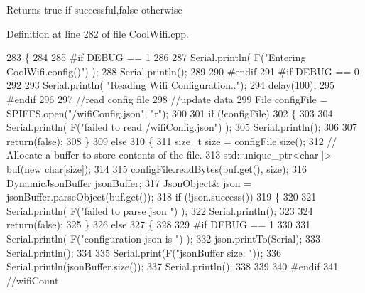 \begin{DoxyReturn}{Returns}
true if successful,false otherwise 
\end{DoxyReturn}


Definition at line 282 of file Cool\+Wifi.\+cpp.


\begin{DoxyCode}
283 \{
284 
285 \textcolor{preprocessor}{#if DEBUG == 1 }
286 
287     Serial.println( F(\textcolor{stringliteral}{"Entering CoolWifi.config()"}) );
288     Serial.println();
289 
290 \textcolor{preprocessor}{#endif}
291 \textcolor{preprocessor}{#if DEBUG == 0}
292 
293     Serial.println( \textcolor{stringliteral}{"Reading Wifi Configuration.."});
294     delay(100);
295 \textcolor{preprocessor}{#endif }
296 
297     \textcolor{comment}{//read config file}
298     \textcolor{comment}{//update data}
299     File configFile = SPIFFS.open(\textcolor{stringliteral}{"/wifiConfig.json"}, \textcolor{stringliteral}{"r"});
300 
301     \textcolor{keywordflow}{if} (!configFile) 
302     \{
303     
304         Serial.println( F(\textcolor{stringliteral}{"failed to read /wifiConfig.json"}) );
305         Serial.println();
306 
307         \textcolor{keywordflow}{return}(\textcolor{keyword}{false});
308     \}
309     \textcolor{keywordflow}{else}
310     \{
311         \textcolor{keywordtype}{size\_t} size = configFile.size();
312         \textcolor{comment}{// Allocate a buffer to store contents of the file.}
313         std::unique\_ptr<char[]> buf(\textcolor{keyword}{new} \textcolor{keywordtype}{char}[size]);
314 
315         configFile.readBytes(buf.get(), size);
316         DynamicJsonBuffer jsonBuffer;
317         JsonObject& json = jsonBuffer.parseObject(buf.get());
318         \textcolor{keywordflow}{if} (!json.success()) 
319         \{
320 
321             Serial.println( F(\textcolor{stringliteral}{"failed to parse json "}) );
322             Serial.println();
323 
324             \textcolor{keywordflow}{return}(\textcolor{keyword}{false});
325         \} 
326         \textcolor{keywordflow}{else}
327         \{
328         
329 \textcolor{preprocessor}{        #if DEBUG == 1 }
330         
331             Serial.println( F(\textcolor{stringliteral}{"configuration json is "}) );
332             json.printTo(Serial);
333             Serial.println();
334 
335             Serial.print(F(\textcolor{stringliteral}{"jsonBuffer size: "}));
336             Serial.println(jsonBuffer.size());
337             Serial.println();
338 
339 
340 \textcolor{preprocessor}{        #endif}
341             \textcolor{comment}{//wifiCount}

\end{DoxyCode}
